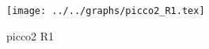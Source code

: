 \begin{figure}[h] \centering\texttt{[image: ../../graphs/picco2\_R1.tex]}\caption{picco2 R1}\label{gr:picco2_R1} \end{figure}
